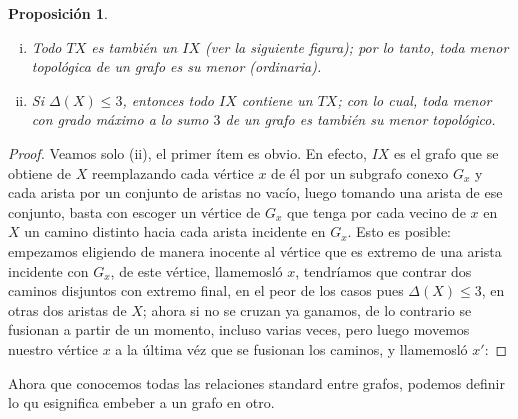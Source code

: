 \documentclass[12pt]{report}
\theoremstyle{plain}
\newtheorem{proposition}[theorem]{Proposición}
\theoremstyle{definition}
\begin{document}
\begin{proposition}
\begin{enumerate}[(i)]
\item Todo $TX$ es también un $IX$ (ver la siguiente figura); por lo tanto, toda menor topológica de un grafo es su menor (ordinaria).
\item Si $\Delta (X) \leq 3$, entonces todo $IX$ contiene un $TX$; con lo cual, toda menor con grado máximo a lo sumo $3$ de un grafo es también su menor topológico.
\end{enumerate}
\end{proposition}
\begin{proof}
Veamos solo (ii), el primer ítem es obvio. En efecto, $IX$ es el grafo que se obtiene de $X$ reemplazando cada vértice $x$ de él por un subgrafo conexo $G_x$ y cada arista por un conjunto de aristas no vacío, luego tomando una arista de ese conjunto, basta con escoger un vértice de $G_x$ que tenga por cada vecino de $x$ en $X$ un camino distinto hacia cada arista incidente en $G_x$. Esto es posible: empezamos eligiendo de manera inocente al vértice que es extremo de una arista incidente con $G_x$, de este vértice, llamemosló $x$, tendríamos que contrar dos caminos disjuntos con extremo final, en el peor de los casos pues $\Delta (X) \leq 3$, en otras dos aristas de $X$; ahora si no se cruzan ya ganamos, de lo contrario se fusionan a partir de un momento, incluso varias veces, pero luego movemos nuestro vértice $x$ a la última véz que se fusionan los caminos, y llamemosló $x'$:


\end{proof}



Ahora que conocemos todas las relaciones standard entre grafos, podemos definir lo qu esignifica embeber a un grafo en otro.
\end{document}
